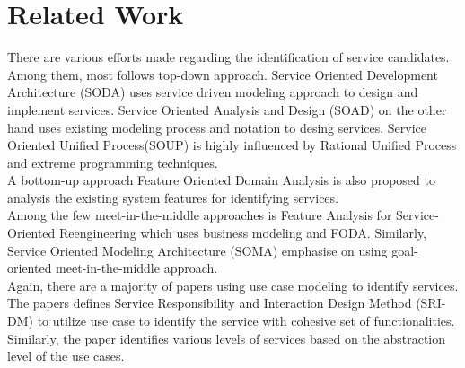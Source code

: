 \section{Related Work}\label{section:service_candidate/related_work}
There are various efforts made regarding the identification of service candidates. Among them, most follows top-down approach. Service Oriented Development Architecture (SODA) uses service driven modeling approach to design and implement services.\cite{Nigam:2005aa} Service Oriented Analysis and Design (SOAD) on the other hand uses existing modeling process and notation to desing services. \cite{Arsanjani:2005aa} Service Oriented Unified Process(SOUP) is highly influenced by Rational Unified Process and extreme programming techniques.\cite{Mittal:2005aa}\\
A bottom-up approach Feature Oriented Domain Analysis is also proposed to analysis the existing system features for identifying services.\cite{Kang:1990aa}\\
Among the few meet-in-the-middle approaches is Feature Analysis for Service-Oriented Reengineering which uses business modeling and FODA. \cite{Chen:2005aa} Similarly, Service Oriented Modeling Architecture (SOMA) emphasise on using goal-oriented meet-in-the-middle approach.\cite{Arsanjani:2004aa}\\
Again, there are a majority of papers using use case modeling to identify services. The papers \cite{Millard:2007aa} \cite{Howard:2009aa} defines Service Responsibility and Interaction Design Method (SRI-DM) to utilize use case to identify the service with cohesive set of functionalities. Similarly, the paper \cite{Fareghzadeh:2008aa} identifies various levels of services based on the abstraction level of the use cases.


